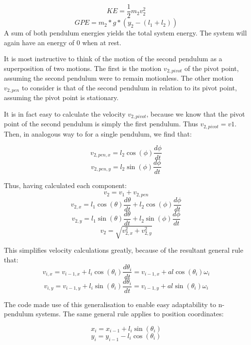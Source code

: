 \documentclass{article}
\begin{document}
\[ KE = \frac{1}{2}m_{2} v_{2}^{2} \]
\[ GPE = m _{2}* g * (y_{2} - (l_{1}+l_{2})) \]
A sum of both pendulum energies yields the total system energy. The system will again have an energy of 0 when at rest. 

It is most instructive to think of the motion of the second pendulum as a superposition of two motions. The first is the motion $v_{2, pivot}$ of the pivot point, assuming the second pendulum were to remain motionless. The other motion $v_{2, pen}$ to consider is that of the second pendulum in relation to its pivot point, assuming the pivot point is stationary. 

It is in fact easy to calculate the velocity $v_{2, pivot}$, because we know that the pivot point of the second pendulum is simply the first pendulum. Thus $v_{2, pivot} = v{1}$. Then, in analogous way to for a single pendulum, we find that:
 
\[ v_{2,pen,x} = l_{2} \cos(\phi) \frac{d\phi}{dt}\]
\[ v_{2, pen,y} = l_{2} \sin(\phi) \frac{d\phi}{dt}\]

Thus, having calculated each component:
\[v_{2} = v_{1} + v_{2, pen}\]
\[ v_{2,x} = l_{1} \cos(\theta) \frac{d\theta}{dt} + l_{2} \cos(\phi) \frac{d\phi}{dt}\]
\[ v_{2,y} = l_{1} \sin(\theta) \frac{d\theta}{dt} + l_{2} \sin(\phi) \frac{d\phi}{dt}\]
\[v_{2} =\sqrt{v_{2,x}^{2} + v_{2,y}^{2}}\]

This simplifies velocity calculations greatly, because of the resultant general rule that: 
\[ v_{i,x} = v_{i-1, x}+ l_{i} \cos(\theta_{i}) \frac{d\theta_{i}}{dt} = v_{i-1, x}+ al\cos(\theta_{i})\omega_{i}\]
\[ v_{i,y} = v_{i-1, y}+ l_{i} \sin(\theta_{i}) \frac{d\theta_{i}}{dt}= v_{i-1, y} + al\sin(\theta_{i})\omega_{i}\]

The code made use of this generalisation to enable easy adaptability to n-pendulum systems. The same general rule applies to position coordinates:

\[ x_{i} = x_{i-1}+ l_{i} \sin(\theta_{i})\]
\[ y_{i} = y_{i-1} - l_{i} \cos(\theta_{i})\]
\end{document}
